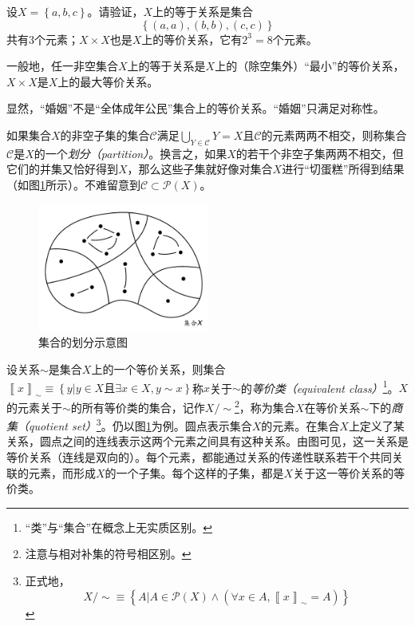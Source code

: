 \documentclass[../main.tex]{subfiles}
\begin{document}
\begin{example}
设$X=\left\{a,b,c\right\}$。请验证，$X$上的等于关系是集合
\[
\left\{\left(a,a\right),\left(b,b\right),\left(c,c\right)\right\}
\]
共有3个元素；$X\times X$也是$X$上的等价关系，它有$2^3=8$个元素。

一般地，任一非空集合$X$上的等于关系是$X$上的（除空集外）“最小”的等价关系，$X\times X$是$X$上的最大等价关系。

显然，“婚姻”不是“全体成年公民”集合上的等价关系。“婚姻”只满足对称性。
\end{example}

如果集合$X$的非空子集的集合$\mathcal{C}$满足$\bigcup_{Y\in\mathcal{C}}Y=X$且$\mathcal{C}$的元素两两不相交，则称集合$\mathcal{C}$是$X$的一个\emph{划分（partition）}。换言之，如果$X$的若干个非空子集两两不相交，但它们的并集又恰好得到$X$，那么这些子集就好像对集合$X$进行“切蛋糕”所得到结果（如图\ref{fig:II.1.1}所示）。不难留意到$\mathcal{C}\subset\mathcal{P}\left(X\right)$。

\begin{figure}[htbp]
    \centering
    \includegraphics[width=0.5\textwidth]{../images/partition.pdf}
    \caption{集合的划分示意图}
    \label{fig:II.1.1}
\end{figure}

设关系$\sim$是集合$X$上的一个等价关系，则集合$\left\llbracket x\right\rrbracket_\sim\equiv\left\{y|y\in X\text{且}\exists x\in X,y\sim x\right\}$称$x$关于$\sim$的\emph{等价类（equivalent class）}\footnote{“类”与“集合”在概念上无实质区别。}。$X$的元素关于$\sim$的所有等价类的集合，记作$X/\sim$\footnote{注意与相对补集的符号相区别。}，称为集合$X$在等价关系$\sim$下的\emph{商集（quotient set）}\footnote{正式地，
\[
X/\sim\equiv\left\{A|A\in\mathcal{P}\left(X\right)\wedge\left(\forall x\in A,\left\llbracket x\right\rrbracket_\sim = A\right)\right\}
\]
}。仍以图\ref{fig:II.1.1}为例。圆点表示集合$X$的元素。在集合$X$上定义了某关系，圆点之间的连线表示这两个元素之间具有这种关系。由图可见，这一关系是等价关系（连线是双向的）。每个元素，都能通过关系的传递性联系若干个共同关联的元素，而形成$X$的一个子集。每个这样的子集，都是$X$关于这一等价关系的等价类。
\end{document}
